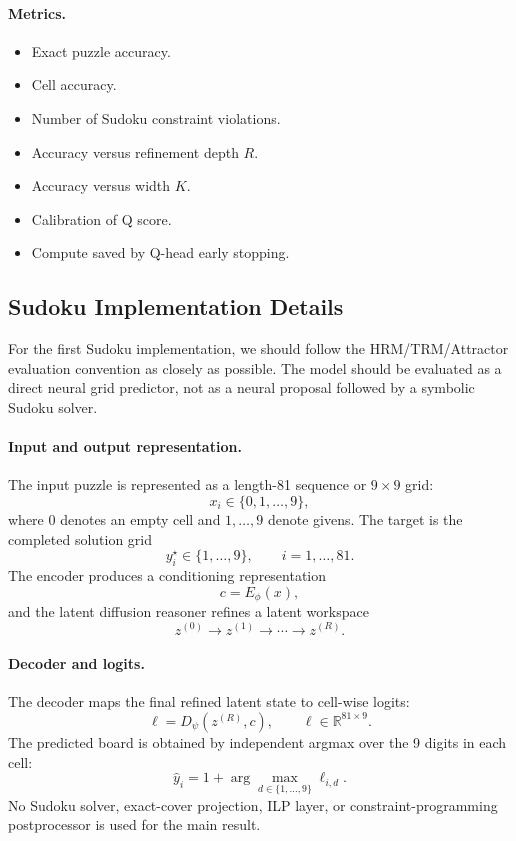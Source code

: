 \documentclass[11pt]{article}
\begin{document}
\paragraph{Metrics.}
\begin{itemize}[itemsep=0pt]
    \item Exact puzzle accuracy.
    \item Cell accuracy.
    \item Number of Sudoku constraint violations.
    \item Accuracy versus refinement depth \(R\).
    \item Accuracy versus width \(K\).
    \item Calibration of Q score.
    \item Compute saved by Q-head early stopping.
\end{itemize}

\subsection{Sudoku Implementation Details}

For the first Sudoku implementation, we should follow the HRM/TRM/Attractor evaluation convention as closely as possible. The model should be evaluated as a direct neural grid predictor, not as a neural proposal followed by a symbolic Sudoku solver.

\paragraph{Input and output representation.}
The input puzzle is represented as a length-81 sequence or \(9\times 9\) grid:
\[
    x_i\in\{0,1,\dots,9\},
\]
where \(0\) denotes an empty cell and \(1,\dots,9\) denote givens. The target is the completed solution grid
\[
    y_i^\star\in\{1,\dots,9\},
    \qquad i=1,\dots,81.
\]
The encoder produces a conditioning representation
\[
    c=E_\phi(x),
\]
and the latent diffusion reasoner refines a latent workspace
\[
    z^{(0)}\rightarrow z^{(1)}\rightarrow\cdots\rightarrow z^{(R)}.
\]

\paragraph{Decoder and logits.}
The decoder maps the final refined latent state to cell-wise logits:
\[
    \ell = D_\psi(z^{(R)},c),
    \qquad
    \ell\in\mathbb R^{81\times 9}.
\]
The predicted board is obtained by independent argmax over the 9 digits in each cell:
\[
    \hat y_i
    =
    1+\arg\max_{d\in\{1,\dots,9\}}\ell_{i,d}.
\]
No Sudoku solver, exact-cover projection, ILP layer, or constraint-programming postprocessor is used for the main result.
\end{document}
